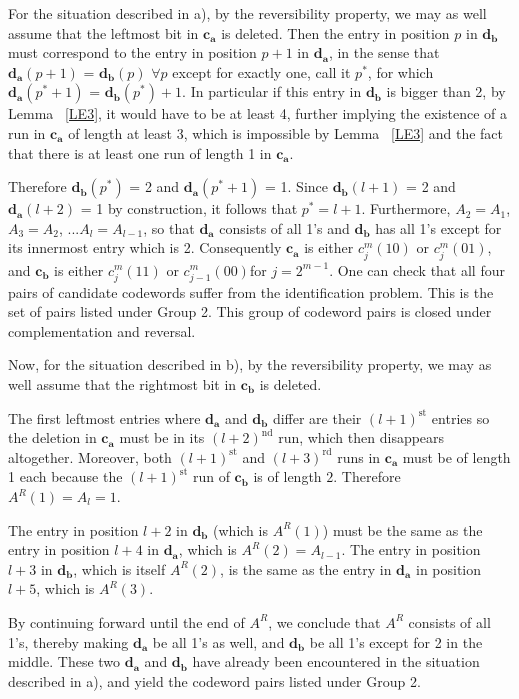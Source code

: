 For the situation described in a), by the reversibility property,
we may as well assume that the leftmost bit in $\mathbf{c_a}$ is
deleted. Then the entry in position $p$ in $\mathbf{d_b}$ must
correspond to the entry in position $p+1$ in $\mathbf{d_a}$, in
the sense that $\mathbf{d_a}(p+1)$ = $\mathbf{d_b}(p)$ $\forall p$
except for exactly one, call it $p^*$, for which
$\mathbf{d_a}(p^*+1)$ = $\mathbf{d_b}(p^*)+1$. In particular if
this entry in $\mathbf{d_b}$ is bigger than 2, by Lemma
~\ref{LE3}, it would have to be at least 4, further implying the
existence of a run in $\mathbf{c_a}$ of length at least 3, which
is impossible by Lemma ~\ref{LE3} and the fact that there is at
least one run of length 1 in $\mathbf{c_a}$.

Therefore $\mathbf{d_b}(p^*)$ = 2 and $\mathbf{d_a}(p^*+1)$ = 1.
Since $\mathbf{d_b}(l+1)$ = 2 and $\mathbf{d_a}(l+2)$ = 1 by
construction, it follows that $p^*=l+1$. Furthermore, $A_2=A_1$,
$A_3=A_2$, ...$A_l=A_{l-1}$, so that $\mathbf{d_a}$ consists of
all 1's and $\mathbf{d_b}$ has all 1's except for its innermost
entry which is 2. Consequently $\mathbf{c_a}$ is either
$c_j^m(10)$ or $c_j^m(01)$, and $\mathbf{c_b}$ is either
$c_j^m(11)$ or $c_{j-1}^m(00)$for $j=2^{m-1}$. One can check that
all four pairs of candidate codewords suffer from the
identification problem. This is the set of pairs listed under
Group 2. This group of codeword pairs is closed under
complementation and reversal.

Now, for the situation described in b), by the reversibility
property, we may as well assume that the rightmost bit in
$\mathbf{c_b}$ is deleted.

The first leftmost entries where $\mathbf{d_a}$ and $\mathbf{d_b}$
differ are their $(l+1)^{\text{st}}$ entries so the deletion in
$\mathbf{c_a}$ must be in its $(l+2)^{\text{nd}}$ run, which then
disappears altogether. Moreover, both $(l+1)^{\text{st}}$ and
$(l+3)^{\text{rd}}$ runs in $\mathbf{c_a}$ must be of length 1
each because the $(l+1)^{\text{st}}$ run of $\mathbf{c_b}$ is of
length $2$. Therefore $A^R(1)=A_l=1$.

The entry in position $l+2$ in $\mathbf{d_b}$ (which is $A^R(1)$)
must be the same as the entry in position $l+4$ in $\mathbf{d_a}$,
which is $A^R(2)=A_{l-1}$. The entry in position $l+3$ in
$\mathbf{d_b}$, which is itself $A^R(2)$, is the same as the entry
in $\mathbf{d_a}$ in position $l+5$, which is $A^R(3)$.

By continuing forward until the end of $A^R$, we conclude that
$A^R$ consists of all 1's, thereby making $\mathbf{d_a}$ be all
1's as well, and $\mathbf{d_b}$ be all 1's except for 2 in the
middle. These two $\mathbf{d_a}$ and $\mathbf{d_b}$ have already
been encountered in the situation described in a), and yield the
codeword pairs listed under Group 2.

